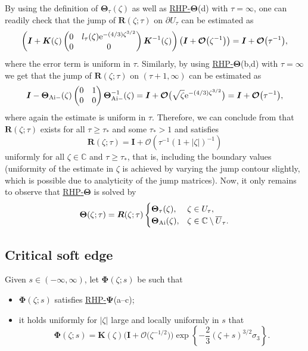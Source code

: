 \documentclass[10pt,a4paper]{amsart}
\numberwithin{equation}{section}
\newcommand{\C}		{\mathbb{C}}
\newcommand{\rhpsi} {\textnormal{RHP}-${\boldsymbol \Psi}$}
\newcommand{\rhth} {\textnormal{RHP}-${\boldsymbol \Theta}$}
\begin{document}
By using the definition of $ \boldsymbol\Theta_\tau(\zeta) $ as well as \hyperref[rhth]{\rhth}(d) with $ \tau=\infty $, one can readily check that the jump of $ \boldsymbol R(\zeta;\tau) $ on $ \partial U_\tau $ can be estimated as
\[
\left(\boldsymbol I + \boldsymbol K(\zeta) \begin{pmatrix} 0 & l_\tau(\zeta){\rm e}^{-(4/3)\zeta^{3/2}} \\ 0 & 0 \end{pmatrix} \boldsymbol K^{-1}(\zeta) \right) \bigl( \boldsymbol I + \boldsymbol{\mathcal O}\bigl(\zeta^{-1}\bigr) \bigr) = \boldsymbol I + \boldsymbol{\mathcal O}\bigl(\tau^{-1}\bigr),
\]
where the error term is uniform in $ \tau $. Similarly, by using \hyperref[rhth]{\rhth}(b,d) with $ \tau=\infty $ we get that the jump of $ \boldsymbol R(\zeta;\tau) $ on $ (\tau+1,\infty) $ can be estimated as
\[
\boldsymbol I - \boldsymbol\Theta_{{\rm Ai}-}(\zeta) \begin{pmatrix} 0 & 1 \\ 0 & 0 \end{pmatrix} \boldsymbol\Theta_{{\rm Ai}-}^{-1}(\zeta) = \boldsymbol I + \boldsymbol{\mathcal O}\bigl(\sqrt\zeta {\rm e}^{-(4/3)\zeta^{3/2}} \bigr) = \boldsymbol I + \boldsymbol{\mathcal O}\bigl(\tau^{-1}\bigr),
\]
where again the estimate is uniform in $ \tau $. Therefore, we can conclude from \cite[Theorem~8.1]{FokasItsKapaevNovokshenov} that $ \boldsymbol R(\zeta;\tau) $ exists for all $ \tau\geq\tau_* $ and some $ \tau_*>1 $ and satisfies
\[
\boldsymbol R(\zeta;\tau) = \boldsymbol I + \boldsymbol{\mathcal O}\left( \tau^{-1}(1+|\zeta|)^{-1}\right)
\]
uniformly for all $ \zeta\in \C $ and $ \tau\geq\tau_* $, that is, including the boundary values (uniformity of the estimate in $ \zeta $ is achieved by varying the jump contour slightly, which is possible due to analyticity of the jump matrices). Now, it only remains to observe that \hyperref[rhth]{\rhth} is solved by
\[
\boldsymbol \Theta(\zeta;\tau) = \boldsymbol R(\zeta;\tau)
\begin{cases}
\boldsymbol\Theta_\tau(\zeta), & \zeta\in U_\tau, \\
\boldsymbol\Theta_{\rm Ai}(\zeta), & \zeta\in\C\setminus\overline U_\tau.
\end{cases}
\]

\subsection{Critical soft edge}


Given $ s\in(-\infty,\infty) $, let $\boldsymbol\Phi(\zeta;s)$ be such that
\begin{itemize}\itemsep=0pt\setlength{\leftskip}{0.1cm}
\label{rhphi}
\item[(a--c)] $\boldsymbol\Phi(\zeta;s)$ satisfies \hyperref[rhpsi]{\rhpsi}(a--c);
\item[(d)] it holds uniformly for $ |\zeta| $ large and locally uniformly in $ s $ that
\[
\boldsymbol\Phi(\zeta;s) = \boldsymbol K(\zeta) \bigl(\boldsymbol I + \boldsymbol{\mathcal O}\bigl(\zeta^{-1/2}\bigl) \bigl) \exp\left\{-\frac23(\zeta+s)^{3/2}\sigma_3\right\}.
\]
\end{itemize}
\end{document}
